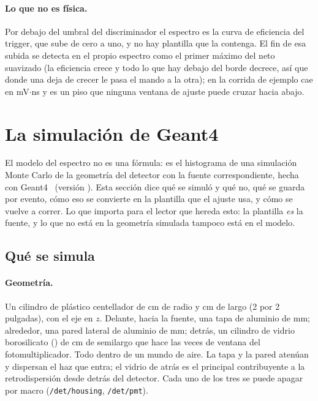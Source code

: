 \documentclass[11pt,a4paper]{article}
\begin{document}
\paragraph{Lo que no es física.} Por debajo del umbral del discriminador el
espectro es la curva de eficiencia del trigger, que sube de cero a uno, y no
hay plantilla que la contenga. El fin de esa subida se detecta en el propio
espectro como el primer máximo del neto suavizado (la eficiencia crece y todo
lo que hay debajo del borde decrece, así que donde una deja de crecer le pasa
el mando a la otra); en la corrida de ejemplo cae en \EjUmbral{} mV$\cdot$ns y
es un piso que ninguna ventana de ajuste puede cruzar hacia abajo.

\begin{center}
\label{tab:pulsos}
{\footnotesize\setlength{\tabcolsep}{3.5pt}}
\end{center}

\section{La simulación de Geant4}
\label{sec:geant4}
\adaptado

El modelo del espectro no es una fórmula: es el histograma de una simulación
Monte Carlo de la geometría del detector con la fuente correspondiente, hecha
con Geant4~\cite{agostinelli2003,allison2016} (versión \SimVersion). Esta
sección dice qué se simuló y qué no, qué se guarda por evento, cómo eso se
convierte en la plantilla que el ajuste usa, y cómo se vuelve a correr. Lo que
importa para el lector que hereda esto: la plantilla \emph{es} la fuente, y
lo que no está en la geometría simulada tampoco está en el modelo.

\subsection{Qué se simula}

\paragraph{Geometría.} Un cilindro de plástico centellador de \SimRadio{} cm de
radio y \SimLargo{} cm de largo (2 por 2 pulgadas), con el eje en $z$. Delante,
hacia la fuente, una tapa de aluminio de \SimTapa{} mm; alrededor, una pared
lateral de aluminio de \SimPared{} mm; detrás, un cilindro de vidrio
borosilicato (\SimVentanaPmt) de \SimPmtSemilargo{} cm de semilargo que hace
las veces de ventana del fotomultiplicador. Todo dentro de un mundo de aire.
La tapa y la pared atenúan y dispersan el haz que entra; el vidrio de atrás es
el principal contribuyente a la retrodispersión desde detrás del detector.
Cada uno de los tres se puede apagar por macro (\texttt{/det/housing},
\texttt{/det/pmt}).
\end{document}
